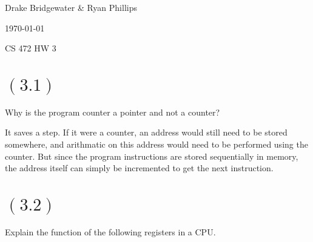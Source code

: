 \documentclass[letterpaper,12pt,titlepage]{article}
\def\name{Drake Bridgewater \& Ryan Phillips}
\begin{document}
\hfill \name

\hfill \today

\hfill CS 472 HW 3

\section*{$(3.1)$} Why is the program counter a pointer and not a counter? \newline



\begin{mdframed}[style=MyFrame]

It saves a step. If it were a counter, an address would still need to be stored somewhere, and arithmatic on this address would need to be performed using the counter. But since the program instructions are stored sequentially in memory, the address itself can simply be incremented to get the next instruction.

\end{mdframed}
  
\section*{$(3.2)$} Explain the function of the following registers in a CPU.
\end{document}
